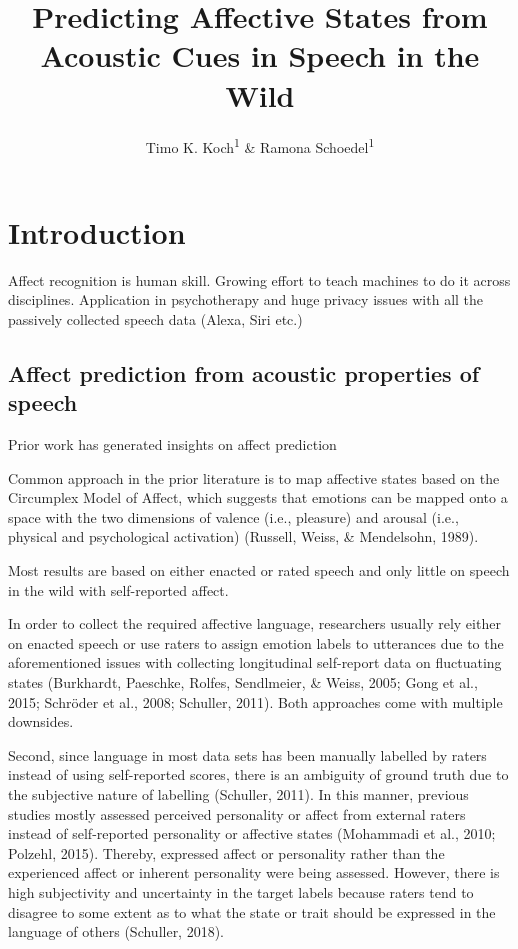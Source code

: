 \documentclass[english,man]{apa6}
\title{Predicting Affective States from Acoustic Cues in Speech in the Wild}
\author{Timo K. Koch\textsuperscript{1} \& Ramona Schoedel\textsuperscript{1}}
\date{}
\affiliation{\vspace{0.5cm}\textsuperscript{1} Ludwig-Maximilan-Universiät München}
\begin{document}
\maketitle

\hypertarget{introduction}{%
\section{Introduction}\label{introduction}}

Affect recognition is human skill. Growing effort to teach machines to do it across disciplines. Application in psychotherapy and huge privacy issues with all the passively collected speech data (Alexa, Siri etc.)

\hypertarget{affect-prediction-from-acoustic-properties-of-speech}{%
\subsection{Affect prediction from acoustic properties of speech}\label{affect-prediction-from-acoustic-properties-of-speech}}

Prior work has generated insights on affect prediction

Common approach in the prior literature is to map affective states based on the Circumplex Model of Affect, which suggests that emotions can be mapped onto a space with the two dimensions of valence (i.e., pleasure) and arousal (i.e., physical and psychological activation) (Russell, Weiss, \& Mendelsohn, 1989).

Most results are based on either enacted or rated speech and only little on speech in the wild with self-reported affect.

In order to collect the required affective language, researchers usually rely either on enacted speech or use raters to assign emotion labels to utterances due to the aforementioned issues with collecting longitudinal self-report data on fluctuating states (Burkhardt, Paeschke, Rolfes, Sendlmeier, \& Weiss, 2005; Gong et al., 2015; Schröder et al., 2008; Schuller, 2011). Both approaches come with multiple downsides.

Second, since language in most data sets has been manually labelled by raters instead of using self-reported scores, there is an ambiguity of ground truth due to the subjective nature of labelling (Schuller, 2011). In this manner, previous studies mostly assessed perceived personality or affect from external raters instead of self-reported personality or affective states (Mohammadi et al., 2010; Polzehl, 2015). Thereby, expressed affect or personality rather than the experienced affect or inherent personality were being assessed. However, there is high subjectivity and uncertainty in the target labels because raters tend to disagree to some extent as to what the state or trait should be expressed in the language of others (Schuller, 2018).
\end{document}
